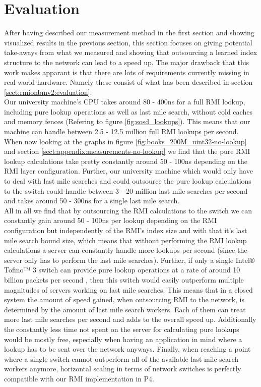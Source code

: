 \section{Evaluation}
After having described our measurement method in the first section and showing visualized results in the previous section, this section focuses on giving potential take-aways from what we measured and showing that outsourcing a learned index structure to the network can lead to a speed up. The major drawback that this work makes apparant is that there are lots of requirements currently missing in real world hardware. Namely these consist of what has been described in section \ref{sect:rmionbmv2:evaluation}.\\

Our university machine's CPU takes around 80 - 400ns for a full RMI lookup, including pure lookup operations as well as last mile search, without cold caches and memory fences (Refering to figure \ref{fig:sosd_lookups}). This means that our machine can handle between 2.5 - 12.5 million full RMI lookups per second. When now looking at the graphs in figure \ref{fig:books_200M_uint32-no-lookup} and section \ref{sect:appendix:measurements-no-lookup} we find that the pure RMI lookup calculations take pretty constantly around 50 - 100ns depending on the RMI layer configuration. Further, our university machine which would only have to deal with last mile searches and could outsource the pure lookup calculations to the switch could handle between 3 - 20 million last mile searches per second and takes around 50 - 300ns for a single last mile search.\\

All in all we find that by outsourcing the RMI calculations to the switch we can constantly gain around 50 - 100ns per lookup depending on the RMI configuration but independently of the RMI's index size and with that it's last mile search bound size, which means that without performing the RMI lookup calculations a server can constantly handle more lookups per second (since the server only has to perform the last mile searches). Further, if only a single Intel® Tofino™ 3 switch can provide pure lookup operations at a rate of around 10 billion packets per second \cite{tofino3-brief}, then this switch would easily outperform multiple magnitudes of servers working on last mile searches. This means that in a closed system the amount of speed gained, when outsourcing RMI to the network, is determined by the amount of last mile search workers. Each of them can treat more last mile searches per second and adds to the overall speed up. Additionally the constantly less time not spent on the server for calculating pure lookups would be mostly free, especially when having an application in mind where a lookup has to be sent over the network anyways. Finally, when reaching a point where a single switch cannot outperform all of the available last mile search workers anymore, horizontal scaling in terms of network switches is perfectly compatible with our RMI implementation in P4.\\
